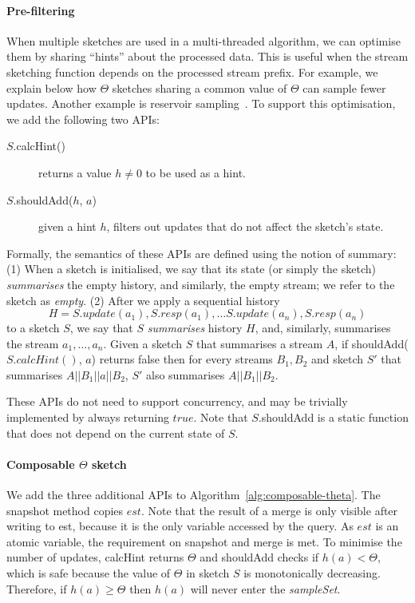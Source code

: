 \paragraph{Pre-filtering} When multiple sketches are used in a multi-threaded algorithm,
we can optimise them by sharing ``hints'' about the processed data.
This is useful when the stream sketching function depends on the processed stream prefix.
For example, we explain below how $\Theta$ sketches sharing a common value of $\Theta$ can sample fewer updates.
Another example is reservoir sampling~\cite{vitter1985random}. To support this optimisation,
we add the following two APIs:
\begin{description}
    \item[$S$.calcHint()] returns a value $h \neq 0$ to be used as a hint.
    \item[$S$.shouldAdd($h$, $a$)] given a hint $h$, filters out updates 
    that do not affect the sketch's state.
\end{description}    
    Formally, the semantics of these APIs are defined using the notion of summary:
    (1) When a sketch is initialised, we say that its state (or simply the sketch) \emph{summarises} the empty history,
    and similarly, the empty stream; we refer to the sketch as \emph{empty}.
    (2) After we apply a sequential history 
		\[H= S.update(a_1), S.resp(a_1), \dots S.update(a_n), S.resp(a_n)\] 
    to a sketch $S$, we say that $S$ \emph{summarises} history $H$, and,
    similarly, summarises the stream $a_1, \dots ,a_n$.
    Given a sketch $S$ that summarises a stream $A$, if shouldAdd($S.calcHint()$, $a$) returns false then
    for every streams $B_1,B_2$ and sketch $S'$ that summarises $A||B_1||a||B_2$,
    $S'$ also summarises $A||B_1||B_2$.

These APIs do not need to support concurrency, and may be trivially implemented by always returning $true$.
Note that $S$.shouldAdd is a static function that does not depend on the current state of $S$.

\paragraph{Composable $\Theta$ sketch}
 
We add the three additional APIs to Algorithm~\ref{alg:composable-theta}.
The snapshot method copies $\mathit{est}$. Note that the
result of a merge is only visible after writing to est, because it is the only variable accessed by
the query. As $\mathit{est}$ is an atomic variable, the requirement on snapshot and merge is
met. To minimise the number of updates, calcHint returns $\Theta$
and shouldAdd checks if $h(a) < \Theta$, which is safe because the value of
$\Theta$ in sketch $S$ is monotonically decreasing. Therefore, if $h(a) \geq \Theta$
then $h(a)$ will never enter the \emph{sampleSet}.


